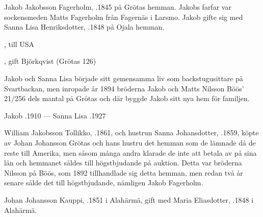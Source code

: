 Jakob Jakobsson Fagerholm, .1845 på Grötas hemman. Jakobs farfar var sockensmeden Matts Fagerholm från Fagernäs i Larsmo. Jakob gifte sig med Sanna Lisa Henriksdotter, .1848 på Ojala hemman.
\begin{jhchildren}
  \item {}, till USA
  \item {}
  \item {}
  \item {}, gift Björkqvist (Grötas 126)
\end{jhchildren}

Jakob och Sanna Lisa började sitt gemensamma liv som backstugusittare på Svartbackan, men inropade år 1894  bröderna Jakob och Matts Nilsson Böös' 21/256 dels mantal på Grötas och där byggde Jakob sitt nya hem för familjen.

Jakob .1910  ---  Sanna Lisa .1927


William Jakobsson Tollikko, .1861, och hustrun Sanna Johansdotter, .1859, köpte av  Johan Johansson Grötas och hans hustru det hemman som de lämnade då de reste till Amerika, men såsom många andra klarade de inte att betala av på sina lån och hemmanet såldes till högstbjudande på auktion. Detta var bröderna Nilsson på Böös, som 1892 tillhandlade sig detta hemman, men redan två år senare sålde det till högstbjudande, nämligen Jakob Fagerholm.


Johan Johansson Kauppi, .1851 i Alahärmä, gift med Maria Eliasdotter, .1848 i Alahärmä.
\begin{jhchildren}
  \item {}
  \item {}
  \item {}
  \item {}
\end{jhchildren}

